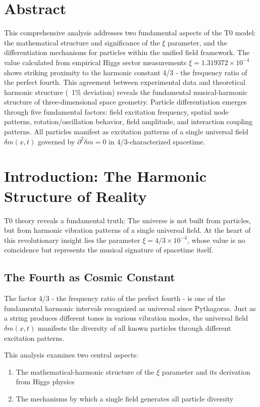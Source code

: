 \section*{Abstract}
		This comprehensive analysis addresses two fundamental aspects of the T0 model: the mathematical structure and significance of the $\xi$ parameter, and the differentiation mechanisms for particles within the unified field framework. The value calculated from empirical Higgs sector measurements $\xi = 1.319372 \times 10^{-4}$ shows striking proximity to the harmonic constant 4/3 - the frequency ratio of the perfect fourth. This agreement between experimental data and theoretical harmonic structure (~1\% deviation) reveals the fundamental musical-harmonic structure of three-dimensional space geometry. Particle differentiation emerges through five fundamental factors: field excitation frequency, spatial node patterns, rotation/oscillation behavior, field amplitude, and interaction coupling patterns. All particles manifest as excitation patterns of a single universal field $\delta m(x,t)$ governed by $\partial^2\delta m = 0$ in 4/3-characterized spacetime.

	
	
	\section{Introduction: The Harmonic Structure of Reality}
	\label{sec:introduction}
	
	T0 theory reveals a fundamental truth: The universe is not built from particles, but from harmonic vibration patterns of a single universal field. At the heart of this revolutionary insight lies the parameter $\xi = 4/3 \times 10^{-4}$, whose value is no coincidence but represents the musical signature of spacetime itself.
	
	\subsection{The Fourth as Cosmic Constant}
	\label{subsec:fourth-constant}
	
	The factor 4/3 - the frequency ratio of the perfect fourth - is one of the fundamental harmonic intervals recognized as universal since Pythagoras. Just as a string produces different tones in various vibration modes, the universal field $\delta m(x,t)$ manifests the diversity of all known particles through different excitation patterns.
	
	This analysis examines two central aspects:
	\begin{enumerate}
		\item The mathematical-harmonic structure of the $\xi$ parameter and its derivation from Higgs physics
		\item The mechanisms by which a single field generates all particle diversity
	\end{enumerate}
	

